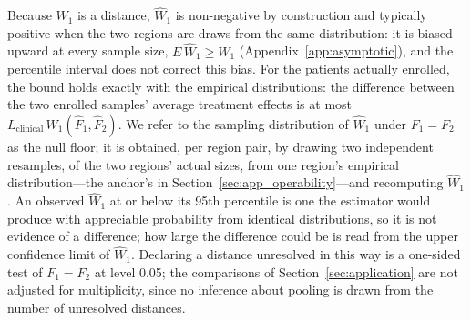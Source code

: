\documentclass[AMA,Times1COL]{WileyNJDv5}
\begin{document}
Because $W_1$ is a distance, $\widehat{W}_1$ is non-negative by construction and typically positive when the two regions are draws from the same distribution: it is biased upward at every sample size, $E\,\widehat{W}_1 \geq W_1$ (Appendix~\ref{app:asymptotic}), and the percentile interval does not correct this bias. For the patients actually enrolled, the bound holds exactly with the empirical distributions: the difference between the two enrolled samples' average treatment effects is at most $L_{\text{clinical}}\,W_1(\hat{F}_1, \hat{F}_2)$. We refer to the sampling distribution of $\widehat{W}_1$ under $F_1 = F_2$ as the null floor; it is obtained, per region pair, by drawing two independent resamples, of the two regions' actual sizes, from one region's empirical distribution---the anchor's in Section~\ref{sec:app_operability}---and recomputing $\widehat{W}_1$. An observed $\widehat{W}_1$ at or below its 95th percentile is one the estimator would produce with appreciable probability from identical distributions, so it is not evidence of a difference; how large the difference could be is read from the upper confidence limit of $\widehat{W}_1$. Declaring a distance unresolved in this way is a one-sided test of $F_1 = F_2$ at level 0.05; the comparisons of Section~\ref{sec:application} are not adjusted for multiplicity, since no inference about pooling is drawn from the number of unresolved distances.
\end{document}
